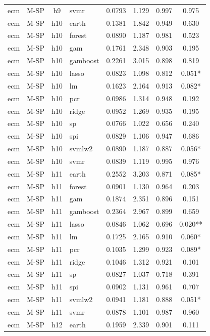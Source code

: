 \begin{ThreePartTable}
\begin{longtable}[t]{llclcccc}
ecm & M-SP & h9 & svmr & 0.0793 & 1.129 & 0.997 & 0.975\\
\addlinespace
ecm & M-SP & h10 & earth & 0.1381 & 1.842 & 0.949 & 0.630\\
ecm & M-SP & h10 & forest & 0.0890 & 1.187 & 0.981 & 0.523\\
ecm & M-SP & h10 & gam & 0.1761 & 2.348 & 0.903 & 0.195\\
ecm & M-SP & h10 & gamboost & 0.2261 & 3.015 & 0.898 & 0.819\\
ecm & M-SP & h10 & lasso & 0.0823 & 1.098 & 0.812 & 0.051*\\
ecm & M-SP & h10 & lm & 0.1623 & 2.164 & 0.913 & 0.082*\\
ecm & M-SP & h10 & pcr & 0.0986 & 1.314 & 0.948 & 0.192\\
ecm & M-SP & h10 & ridge & 0.0952 & 1.269 & 0.935 & 0.195\\
ecm & M-SP & h10 & sp & 0.0766 & 1.022 & 0.656 & 0.240\\
ecm & M-SP & h10 & spi & 0.0829 & 1.106 & 0.947 & 0.686\\
ecm & M-SP & h10 & svmlw2 & 0.0890 & 1.187 & 0.887 & 0.056*\\
ecm & M-SP & h10 & svmr & 0.0839 & 1.119 & 0.995 & 0.976\\
\addlinespace
ecm & M-SP & h11 & earth & 0.2552 & 3.203 & 0.871 & 0.085*\\
ecm & M-SP & h11 & forest & 0.0901 & 1.130 & 0.964 & 0.203\\
ecm & M-SP & h11 & gam & 0.1874 & 2.351 & 0.896 & 0.151\\
ecm & M-SP & h11 & gamboost & 0.2364 & 2.967 & 0.899 & 0.659\\
ecm & M-SP & h11 & lasso & 0.0846 & 1.062 & 0.696 & 0.020**\\
ecm & M-SP & h11 & lm & 0.1725 & 2.165 & 0.910 & 0.060*\\
ecm & M-SP & h11 & pcr & 0.1035 & 1.299 & 0.923 & 0.089*\\
ecm & M-SP & h11 & ridge & 0.1046 & 1.312 & 0.921 & 0.101\\
ecm & M-SP & h11 & sp & 0.0827 & 1.037 & 0.718 & 0.391\\
ecm & M-SP & h11 & spi & 0.0902 & 1.131 & 0.961 & 0.707\\
ecm & M-SP & h11 & svmlw2 & 0.0941 & 1.181 & 0.888 & 0.051*\\
ecm & M-SP & h11 & svmr & 0.0878 & 1.101 & 0.987 & 0.960\\
\addlinespace
ecm & M-SP & h12 & earth & 0.1959 & 2.339 & 0.901 & 0.111\\

\end{longtable}
\end{ThreePartTable}
